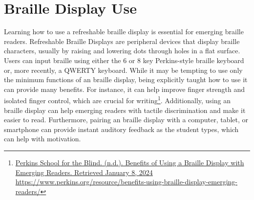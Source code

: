 \pagebreak\hypertarget{appx10}{}\section[Braille Display Use]{Braille Display Use}\label{appx10}
Learning how to use a refreshable braille display is essential for emerging braille readers. Refreshable Braille Displays are peripheral devices that display braille characters, usually by raising and lowering dots through holes in a flat surface. Users can input braille using either the 6 or 8 key Perkins-style braille keyboard or, more recently, a QWERTY keyboard.  While it may be tempting to use only the minimum functions of an braille display, being explicitly taught how to use it can provide many benefits. For instance, it can help improve finger strength and isolated finger control, which are crucial for writing\footnote{\raggedright \href{https://www.perkins.org/resource/benefits-using-braille-display-emerging-readers/}{Perkins School for the Blind. (n.d.). Benefits of Using a Braille Display with Emerging Readers. Retrieved January 8, 2024} \url{https://www.perkins.org/resource/benefits-using-braille-display-emerging-readers/}}. Additionally, using an braille display can help emerging readers with tactile discrimination and make it easier to read. Furthermore, pairing an braille display with a computer, tablet, or smartphone can provide instant auditory feedback as the student types, which can help with motivation.
